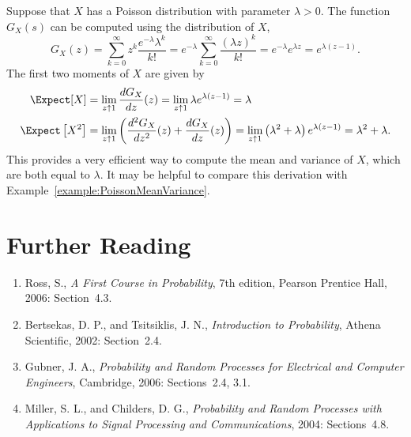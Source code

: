 \begin{example}
Suppose that $X$ has a Poisson distribution with parameter $\lambda > 0$.
The function $G_X(s)$ can be computed using the distribution of $X$,
\begin{equation*}
G_X(z) = \sum_{k = 0}^\infty z^{k} \frac{e^{-\lambda}\lambda^k}{k!}
= e^{-\lambda} \sum_{k = 0}^\infty \frac{(\lambda z)^k}{k!}
= e^{-\lambda} e^{\lambda z} = e^{\lambda(z - 1)} .
\end{equation*}
The first two moments of $X$ are given by
\begin{align*}
\Expect [X] &= \lim_{z \uparrow 1} \frac{d G_X}{dz} (z)
= \lim_{z \uparrow 1} \lambda e^{\lambda(z - 1)} = \lambda \\
\Expect \left[ X^2 \right] &= \lim_{z \uparrow 1}
\left( \frac{d^2 G_X}{dz^2} (z) + \frac{d G_X}{dz} (z) \right)
= \lim_{z \uparrow 1} \left( \lambda^2 + \lambda \right)
e^{\lambda (z - 1)} = \lambda^2 + \lambda .
\end{align*}
This provides a very efficient way to compute the mean and variance of $X$, which are both equal to $\lambda$.
It may be helpful to compare this derivation with Example~\ref{example:PoissonMeanVariance}.
\end{example}
\fi

\section*{Further Reading}

\begin{small}
\begin{enumerate}
\item Ross, S., \emph{A First Course in Probability}, 7th edition, Pearson Prentice Hall, 2006: Section~4.3.
\item Bertsekas, D. P., and Tsitsiklis, J. N., \emph{Introduction to Probability}, Athena Scientific, 2002: Section~2.4.
\item Gubner, J. A., \emph{Probability and Random Processes for Electrical and Computer Engineers}, Cambridge, 2006: Sections~2.4, 3.1.
\item Miller, S. L., and Childers, D. G., \emph{Probability and Random Processes with Applications to Signal Processing and Communications}, 2004: Sections~4.8.
\end{enumerate}
\end{small}

